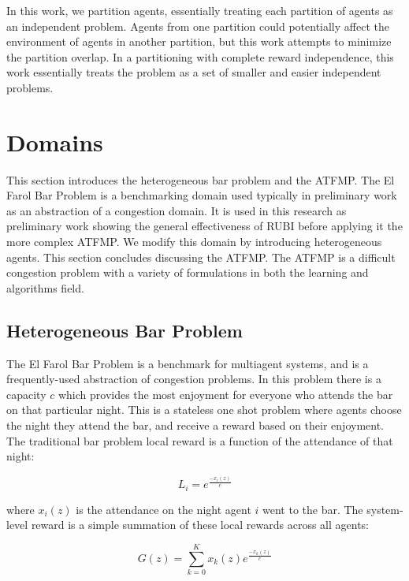 \documentclass[onehalf,11pt]{beavtex}
\begin{document}
In this work, we partition agents, essentially treating each partition of agents as an independent problem. Agents from one partition could potentially affect the environment of agents in another partition, but this work attempts to minimize the partition overlap. In a partitioning with complete reward independence, this work essentially treats the problem as a set of smaller and easier independent problems.

\section{Domains}

This section introduces the heterogeneous bar problem and the ATFMP. The El Farol Bar Problem \cite{BarProblem} is a benchmarking domain used typically in preliminary work as an abstraction of a congestion domain. It is used in this research as preliminary work showing the general effectiveness of RUBI before applying it the more complex ATFMP. We modify this domain by introducing heterogeneous agents. This section concludes discussing the ATFMP. The ATFMP is a difficult congestion problem with a variety of formulations in both the learning and algorithms field.

\subsection{Heterogeneous Bar Problem}

The El Farol Bar Problem \cite{BarProblem} is a benchmark for multiagent systems, and is a frequently-used abstraction of congestion problems. In this problem there is a capacity $c$ which provides the most enjoyment for everyone who attends the bar on that particular night. This is a stateless one shot problem where agents choose the night they attend the bar, and receive a reward based on their enjoyment. The traditional bar problem local reward is a function of the attendance of that night:

\begin{equation} \label{eq:BarProblem-Local}
L_i = e^{\frac{-x_i(z)}{c}}
\end{equation}

where $x_i(z)$ is the attendance on the night agent $i$ went to the bar. The system-level reward is a simple summation of these local rewards across all agents:

\begin{equation} \label{eq:BarProblem-Global}
G(z) = \sum_{k=0}^K x_k(z) e^{\frac{-x_k(z)}{c}}
\end{equation}
\end{document}
